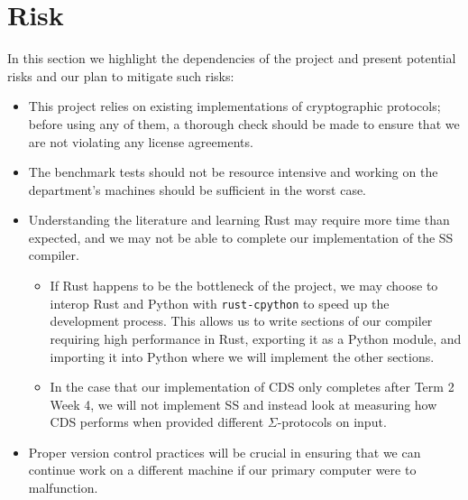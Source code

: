 \documentclass[a4paper,fleqn,12pt]{article}
\begin{document}
\section{Risk}
In this section we highlight the dependencies of the project and present potential risks and our plan to mitigate such risks:
\begin{itemize}
    \item This project relies on existing implementations of cryptographic protocols; before using any of them, a thorough check should be made to ensure that we are not violating any license agreements.
    \item The benchmark tests should not be resource intensive and working on the department's machines should be sufficient in the worst case. 
    \item Understanding the literature and learning Rust may require more time than expected, and we may not be able to complete our implementation of the SS compiler.
    \begin{itemize}
        \item If Rust happens to be the bottleneck of the project, we may choose to interop Rust and Python with \texttt{rust-cpython} to speed up the development process. This allows us to write sections of our compiler requiring high performance in Rust, exporting it as a Python module, and importing it into Python where we will implement the other sections.
        \item In the case that our implementation of CDS only completes after Term 2 Week 4, we will not implement SS and instead look at measuring how CDS performs when provided different $\Sigma$-protocols on input.
    \end{itemize}
    \item Proper version control practices will be crucial in ensuring that we can continue work on a different machine if our primary computer were to malfunction.
\end{itemize}
 



\end{document}
